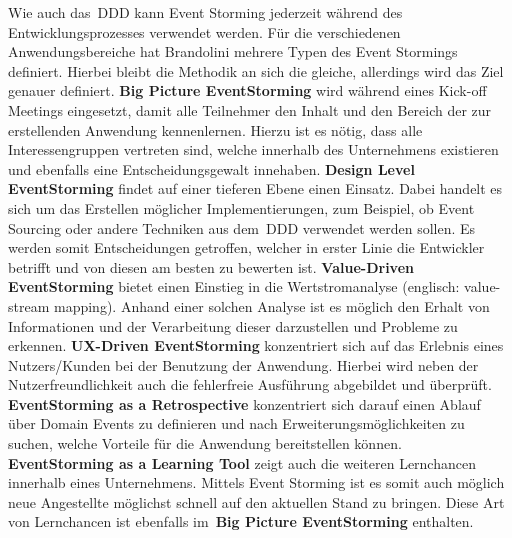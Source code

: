 Wie auch das~\ac{DDD} kann Event Storming jederzeit während des Entwicklungsprozesses verwendet werden.
Für die verschiedenen Anwendungsbereiche hat Brandolini mehrere Typen des Event Stormings definiert.
Hierbei bleibt die Methodik an sich die gleiche, allerdings wird das Ziel genauer definiert.\newline
\textbf{Big Picture EventStorming} wird während eines Kick-off Meetings eingesetzt, damit alle Teilnehmer den Inhalt und den Bereich der zur erstellenden Anwendung kennenlernen.
Hierzu ist es nötig, dass alle Interessengruppen vertreten sind, welche innerhalb des Unternehmens existieren und ebenfalls eine Entscheidungsgewalt innehaben.\newline
\textbf{Design Level EventStorming} findet auf einer tieferen Ebene einen Einsatz.
Dabei handelt es sich um das Erstellen möglicher Implementierungen, zum Beispiel, ob Event Sourcing oder andere Techniken aus dem~\ac{DDD} verwendet werden sollen.
Es werden somit Entscheidungen getroffen, welcher in erster Linie die Entwickler betrifft und von diesen am besten zu bewerten ist.\newline
\textbf{Value-Driven EventStorming} bietet einen Einstieg in die Wertstromanalyse (englisch: value-stream mapping).
Anhand einer solchen Analyse ist es möglich den Erhalt von Informationen und der Verarbeitung dieser darzustellen und Probleme zu erkennen.\newline
\textbf{UX-Driven EventStorming} konzentriert sich auf das Erlebnis eines Nutzers/Kunden bei der Benutzung der Anwendung.
Hierbei wird neben der Nutzerfreundlichkeit auch die fehlerfreie Ausführung abgebildet und überprüft.\newline
\textbf{EventStorming as a Retrospective} konzentriert sich darauf einen Ablauf über Domain Events zu definieren und nach
Erweiterungsmöglichkeiten zu suchen, welche Vorteile für die Anwendung bereitstellen können.\newline
\textbf{EventStorming as a Learning Tool} zeigt auch die weiteren Lernchancen innerhalb eines Unternehmens.
Mittels Event Storming ist es somit auch möglich neue Angestellte möglichst schnell auf den aktuellen Stand zu bringen.
Diese Art von Lernchancen ist ebenfalls im~\textbf{Big Picture EventStorming} enthalten.

